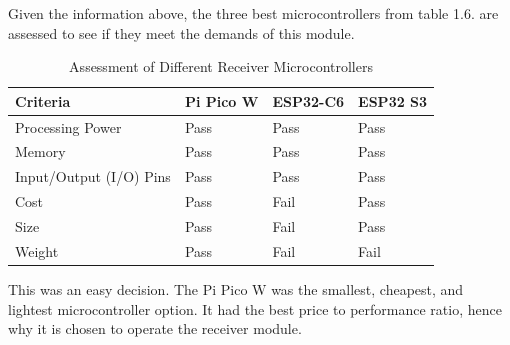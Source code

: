 \documentclass[class=report,11pt,crop=false]{standalone}
\begin{document}
Given the information above, the three best microcontrollers from table 1.6. are assessed to see if they meet the demands of this module. 

\begin{table}[ht]
\centering
\begin{tabular}{|l|l|l|l|}
\hline
\textbf{Criteria} & \textbf{Pi Pico W} & \textbf{ESP32-C6} & \textbf{ESP32 S3} \\
\hline
Processing Power & Pass & Pass & Pass \\
\hline
Memory & Pass & Pass & Pass \\
\hline
Input/Output (I/O) Pins & Pass & Pass & Pass \\
\hline
Cost & Pass & Fail & Pass \\
\hline
Size & Pass & Fail & Pass \\
\hline
Weight & Pass & Fail & Fail \\
\hline
\end{tabular}
\caption{Assessment of Different Receiver Microcontrollers}
\label{tab:microcontroller_assessment2}
\end{table}

This was an easy decision. The Pi Pico W was the smallest, cheapest, and lightest microcontroller option. It had the best price to performance ratio, hence why it is chosen to operate the receiver module. 
\end{document}
